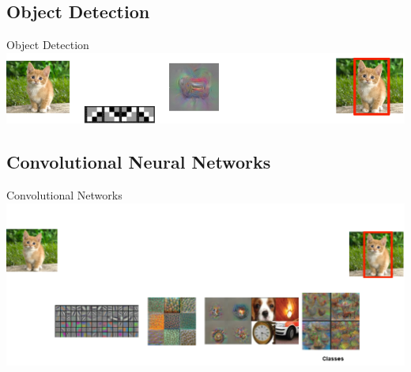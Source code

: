 \documentclass{beamer}
\begin{document}
\begin{darkframes}
\subsection{Object Detection}
	\begin{frame}{Object Detection}
	\includegraphics[width=\textwidth]{fig/ObjectDetection}
	\end{frame}
	\subsection{Convolutional Neural Networks}
		\begin{frame}{Convolutional Networks}
	\includegraphics[width=\textwidth]{fig/cnn_mine}
\end{frame}


\end{darkframes}
\end{document}
